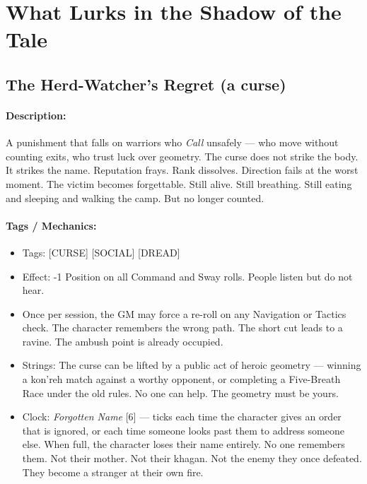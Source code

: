 \section*{What Lurks in the Shadow of the Tale}

\subsection*{The Herd-Watcher's Regret (a curse)}

\paragraph{Description:}

A punishment that falls on warriors who \textit{Call} unsafely --- who move without counting exits, who trust luck over geometry. The curse does not strike the body. It strikes the name. Reputation frays. Rank dissolves. Direction fails at the worst moment. The victim becomes forgettable. Still alive. Still breathing. Still eating and sleeping and walking the camp. But no longer counted.

\paragraph{Tags / Mechanics:}

\begin{itemize}
\item Tags: [CURSE] [SOCIAL] [DREAD]
\item Effect: -1 Position on all Command and Sway rolls. People listen but do not hear.
\item Once per session, the GM may force a re-roll on any Navigation or Tactics check. The character remembers the wrong path. The short cut leads to a ravine. The ambush point is already occupied.
\item Strings: The curse can be lifted by a public act of heroic geometry --- winning a kon'reh match against a worthy opponent, or completing a Five-Breath Race under the old rules. No one can help. The geometry must be yours.
\item Clock: \textit{Forgotten Name} [6] --- ticks each time the character gives an order that is ignored, or each time someone looks past them to address someone else. When full, the character loses their name entirely. No one remembers them. Not their mother. Not their khagan. Not the enemy they once defeated. They become a stranger at their own fire.
\end{itemize}

